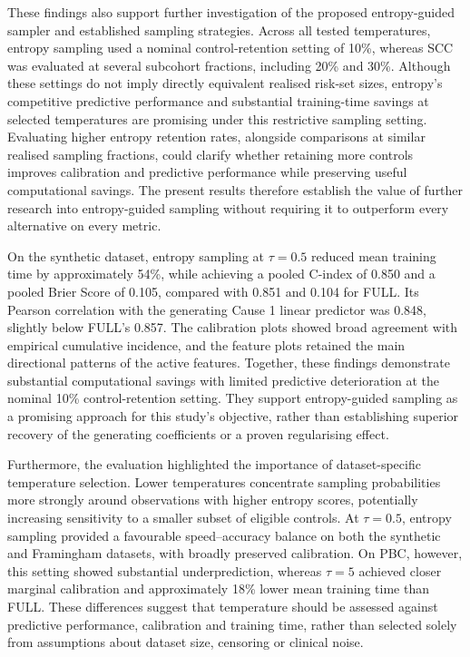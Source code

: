 \documentclass[a4paper,twoside,12pt]{report}
\begin{document}
These findings also support further investigation of the proposed entropy-guided sampler and established sampling strategies. Across all tested temperatures, entropy sampling used a nominal control-retention setting of 10\%, whereas SCC was evaluated at several subcohort fractions, including 20\% and 30\%. Although these settings do not imply directly equivalent realised risk-set sizes, entropy's competitive predictive performance and substantial training-time savings at selected temperatures are promising under this restrictive sampling setting. Evaluating higher entropy retention rates, alongside comparisons at similar realised sampling fractions, could clarify whether retaining more controls improves calibration and predictive performance while preserving useful computational savings. The present results therefore establish the value of further research into entropy-guided sampling without requiring it to outperform every alternative on every metric.

On the synthetic dataset, entropy sampling at $\tau=0.5$ reduced mean training time by approximately 54\%, while achieving a pooled C-index of 0.850 and a pooled Brier Score of 0.105, compared with 0.851 and 0.104 for FULL. Its Pearson correlation with the generating Cause 1 linear predictor was 0.848, slightly below FULL's 0.857. The calibration plots showed broad agreement with empirical cumulative incidence, and the feature plots retained the main directional patterns of the active features. Together, these findings demonstrate substantial computational savings with limited predictive deterioration at the nominal 10\% control-retention setting. They support entropy-guided sampling as a promising approach for this study's objective, rather than establishing superior recovery of the generating coefficients or a proven regularising effect.

Furthermore, the evaluation highlighted the importance of dataset-specific temperature selection. Lower temperatures concentrate sampling probabilities more strongly around observations with higher entropy scores, potentially increasing sensitivity to a smaller subset of eligible controls. At $\tau=0.5$, entropy sampling provided a favourable speed--accuracy balance on both the synthetic and Framingham datasets, with broadly preserved calibration. On PBC, however, this setting showed substantial underprediction, whereas $\tau=5$ achieved closer marginal calibration and approximately 18\% lower mean training time than FULL. These differences suggest that temperature should be assessed against predictive performance, calibration and training time, rather than selected solely from assumptions about dataset size, censoring or clinical noise.
\end{document}
